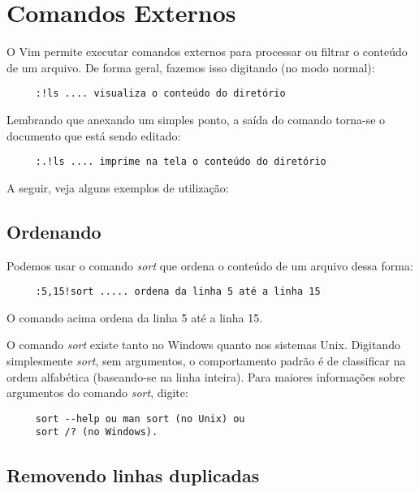 
\chapter{Comandos Externos}
O Vim permite executar comandos externos para processar ou filtrar o
conteúdo de um arquivo. De forma geral, fazemos isso digitando (no
modo normal):

\begin{verbatim}
     :!ls .... visualiza o conteúdo do diretório
\end{verbatim}

Lembrando que anexando um simples ponto, a saída do comando torna-se o 
documento que está sendo editado:

\begin{verbatim}
     :.!ls .... imprime na tela o conteúdo do diretório
\end{verbatim}

A seguir, veja alguns exemplos de utilização:

\section{Ordenando}
Podemos usar o comando {\em sort} que ordena o conteúdo de um arquivo dessa forma:

\begin{verbatim}
     :5,15!sort ..... ordena da linha 5 até a linha 15
\end{verbatim}

O comando acima ordena da linha 5 até a linha 15.

O comando {\em sort} existe tanto no Windows quanto nos sistemas Unix.
Digitando simplesmente {\em sort}, sem argumentos, o comportamento padrão
é de classificar na ordem alfabética (baseando-se na linha inteira).
Para maiores informações sobre argumentos do comando {\em sort}, digite:

\begin{verbatim}
     sort --help ou man sort (no Unix) ou
     sort /? (no Windows).
\end{verbatim}

\section{Removendo linhas duplicadas}


